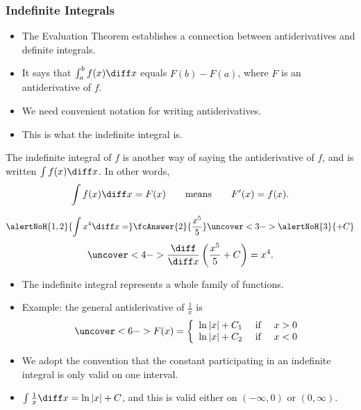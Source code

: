 \begin{frame}\frametitle{Indefinite Integrals}
\begin{itemize}
\item  The Evaluation Theorem establishes a connection between antiderivatives and definite integrals.
\item  It says that $\int_a^b f(x)\diff x$ equals $F(b) - F(a)$, where $F$ is an antiderivative of $f$.
\item  We need convenient notation for writing antiderivatives.
\item  This is what the indefinite integral is.
\end{itemize}
\begin{definition}
The indefinite integral of $f$ is another way of saying the antiderivative of $f$, and is written $\int f(x) \diff x$.  In other words,
\abovedisplayskip=0pt
\belowdisplayskip=0pt
\[
\int f(x) \diff x = F(x) \qquad \text{means}\qquad F'(x) = f(x).
\]
\end{definition}
\end{frame}

\begin{frame}
\begin{example}
\abovedisplayskip=0pt
\belowdisplayskip=0pt
\[
\alertNoH{1,2}{\int x^4 \diff x =} \fcAnswer{2}{\frac{x^5}{5}} \uncover<3->{\alertNoH{ 3}{+ C}}
\]
\abovedisplayskip=0pt
\belowdisplayskip=0pt
\[
\uncover<4->{\frac{\diff}{\diff x}\left( \frac{x^5}{5} + C\right) = x^4.}
\]
\end{example}
\begin{itemize}
\item<5-> The indefinite integral represents a whole family of functions.
\item<6-> Example:
the general antiderivative of $\frac{1}{x}$ is
\abovedisplayskip=0pt
\belowdisplayskip=0pt
\[
\uncover<6->{%
F(x) = \left\{ \begin{array}{ccc}
\ln |x| + C_1 & \text{ if } & x > 0\\
\ln |x| + C_2 & \text{ if } & x < 0
\end{array}\right.
}%
\]
\item<7->  We adopt the convention that the constant participating in an indefinite integral is only valid on one interval.
\item<8->  $\int \frac{1}{x} \diff x = \ln |x| + C$, and this is valid either on $(-\infty , 0)$ or $(0, \infty)$.
\end{itemize}
\end{frame}
